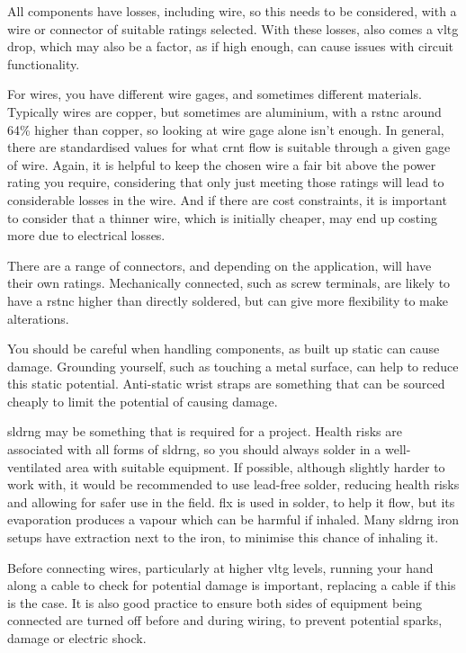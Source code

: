 \documentclass[a4paper,11pt]{report}
\begin{document}
All components have losses, including wire, so this needs to be considered, with a wire or connector of suitable ratings selected. With these losses, also comes a \gls{vltg} drop, which may also be a factor, as if high enough, can cause issues with circuit functionality.

For wires, you have different wire \gls{gage}s, and sometimes different materials. Typically wires are copper, but sometimes are aluminium, with a \gls{rstnc} around 64\% higher than copper, so looking at wire \gls{gage} alone isn't enough. In general, there are standardised values for what \gls{crnt} flow is suitable through a given \gls{gage} of wire. Again, it is helpful to keep the chosen wire a fair bit above the power rating you require, considering that only just meeting those ratings will lead to considerable losses in the wire. And if there are cost constraints, it is important to consider that a thinner wire, which is initially cheaper, may end up costing more due to electrical losses.

There are a range of connectors, and depending on the application, will have their own ratings. Mechanically connected, such as screw terminals, are likely to have a \gls{rstnc} higher than directly soldered, but can give more flexibility to make alterations.

You should be careful when handling components, as built up static can cause damage. Grounding yourself, such as touching a metal surface, can help to reduce this static potential. Anti-static wrist straps are something that can be sourced cheaply to limit the potential of causing damage.

\gls{sldrng} may be something that is required for a project. Health risks are associated with all forms of \gls{sldrng}, so you should always solder in a well-ventilated area with suitable equipment. If possible, although slightly harder to work with, it would be recommended to use lead-free solder, reducing health risks and allowing for safer use in the field. \gls{flx} is used in solder, to help it flow, but its evaporation produces a vapour which can be harmful if inhaled. Many \gls{sldrng} iron setups have extraction next to the iron, to minimise this chance of inhaling it.

Before connecting wires, particularly at higher \gls{vltg} levels, running your hand along a cable to check for potential damage is important, replacing a cable if this is the case. It is also good practice to ensure both sides of equipment being connected are turned off before and during wiring, to prevent potential sparks, damage or electric shock.
\end{document}
